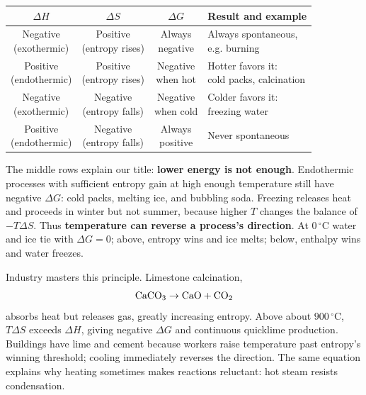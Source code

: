 \begin{table}[h]
\centering
\begin{tabular}{cccl}
\toprule
$\Delta H$ & $\Delta S$ & $\Delta G$ & Result and example \\
\midrule
\shortstack{Negative\\(exothermic)} & \shortstack{Positive\\(entropy rises)} & \shortstack{Always\\negative} & \shortstack[l]{Always spontaneous,\\e.g. burning} \\
\shortstack{Positive\\(endothermic)} & \shortstack{Positive\\(entropy rises)} & \shortstack{Negative\\when hot} & \shortstack[l]{Hotter favors it:\\cold packs, calcination} \\
\shortstack{Negative\\(exothermic)} & \shortstack{Negative\\(entropy falls)} & \shortstack{Negative\\when cold} & \shortstack[l]{Colder favors it:\\freezing water} \\
\shortstack{Positive\\(endothermic)} & \shortstack{Negative\\(entropy falls)} & \shortstack{Always\\positive} & Never spontaneous \\
\bottomrule
\end{tabular}
\end{table}

The middle rows explain our title: \textbf{lower energy is not enough}. Endothermic processes with sufficient entropy gain at high enough temperature still have negative $\Delta G$: cold packs, melting ice, and bubbling soda. Freezing releases heat and proceeds in winter but not summer, because higher $T$ changes the balance of $-T\Delta S$. Thus \textbf{temperature can reverse a process's direction}. At $0\,^{\circ}\mathrm{C}$ water and ice tie with $\Delta G=0$; above, entropy wins and ice melts; below, enthalpy wins and water freezes.

Industry masters this principle. Limestone calcination, \[\mathrm{CaCO_3} \rightarrow \mathrm{CaO} + \mathrm{CO_2}\] absorbs heat but releases gas, greatly increasing entropy. Above about $900\,^{\circ}\mathrm{C}$, $T\Delta S$ exceeds $\Delta H$, giving negative $\Delta G$ and continuous quicklime production. Buildings have lime and cement because workers raise temperature past entropy's winning threshold; cooling immediately reverses the direction. The same equation explains why heating sometimes makes reactions reluctant: hot steam resists condensation.

